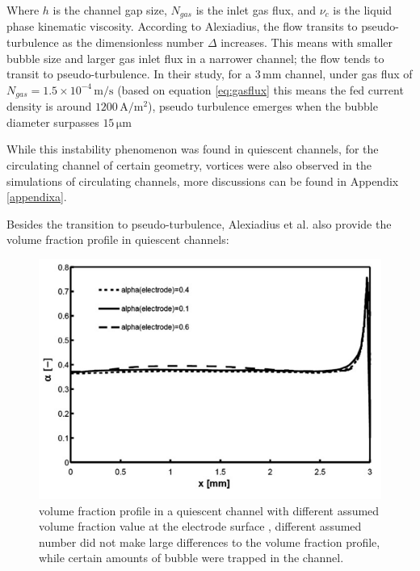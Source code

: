 Where $h$ is the channel gap size, $N_{gas}$ is the inlet gas flux, and $\nu_c$ is the liquid phase kinematic viscosity. According to Alexiadius, the flow transits to pseudo-turbulence as the dimensionless number $\Delta$ increases. This means with smaller bubble size and larger gas inlet flux in a narrower channel; the flow tends to transit to pseudo-turbulence. In their study, for a $3 \, \mathrm{mm}$ channel, under gas flux of $N_{gas} = 1.5 \times 10^{-4} \, \mathrm{m/s}$ (based on equation \ref{eq:gasflux} this means the fed current density is around $1200 \, \mathrm{A/m^2}$), pseudo turbulence emerges when the bubble diameter surpasses $15 \, \mathrm{μm}$

While this instability phenomenon was found in quiescent channels, for the circulating channel of certain geometry, vortices were also observed in the simulations of circulating channels, more discussions can be found in Appendix \ref{appendixa}.

Besides the transition to pseudo-turbulence, Alexiadius et al. also provide the volume fraction profile in quiescent channels:

\begin{figure}[H]
    \centering
    \includegraphics[scale=0.6]{volumefractionprofile.png}
    \caption{volume fraction profile in a quiescent channel with different assumed volume fraction value at the electrode surface \cite{Alexiadis2012}, different assumed number did not make large differences to the volume fraction profile, while certain amounts of bubble were trapped in the channel.}
    \label{volumefraction}
\end{figure}



